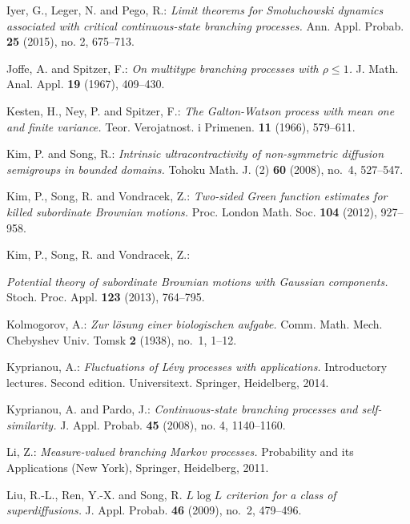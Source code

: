 \documentclass[12pt,a4paper]{amsart}
\theoremstyle{definition}
\numberwithin{equation}{section}
\begin{document}
\begin{thebibliography}{10}
	
	Iyer, G., Leger, N. and Pego, R.:
	\emph{Limit theorems for Smoluchowski dynamics associated with critical continuous-state branching processes.}
	Ann. Appl. Probab. \textbf{25} (2015), no. 2, 675–713.

	
	Joffe, A. and Spitzer, F.:
	\emph{On multitype branching processes with {$\rho \leq 1$}.}
	J. Math. Anal. Appl. \textbf{19} (1967), 409--430.
	
	
	Kesten, H., Ney, P. and Spitzer, F.:
	\emph{The {G}alton-{W}atson process with mean one and finite variance.}
	Teor. Verojatnost. i Primenen. \textbf{11} (1966), 579--611.
	
	
	Kim, P. and Song, R.:
	\emph{Intrinsic ultracontractivity of non-symmetric diffusion semigroups in bounded domains.}
	Tohoku Math. J. (2) \textbf{60} (2008), no.~4, 527--547.

  Kim, P., Song, R. and Vondracek, Z.:
  \emph{Two-sided Green function estimates for killed subordinate Brownian motions.}
  Proc. London Math. Soc. \textbf{104} (2012), 927--958.

  Kim, P., Song, R. and Vondracek, Z.:

  \emph{Potential theory of subordinate Brownian motions with Gaussian components.}
  Stoch. Proc. Appl. \textbf{123} (2013), 764--795.
	
	Kolmogorov, A.:
	\emph{Zur l{\"o}sung einer biologischen aufgabe.}
	Comm. Math. Mech. Chebyshev Univ. Tomsk \textbf{2} (1938), no.~1, 1--12.
	
	Kyprianou, A.:
	\emph{Fluctuations of Lévy processes with applications.}
	Introductory lectures. Second edition. Universitext. Springer, Heidelberg, 2014.
	
	
	Kyprianou, A. and Pardo, J.:
	\emph{Continuous-state branching processes and self-similarity.}
	J. Appl. Probab. \textbf{45} (2008), no. 4, 1140–1160.

	Li, Z.:
	\emph{Measure-valued branching {M}arkov processes.}
	Probability and its Applications (New York), Springer, Heidelberg, 2011.

	
  Liu, R.-L., Ren, Y.-X. and Song, R.
	\emph{{$L\log L$} criterion for a class of superdiffusions.}
	J. Appl. Probab. \textbf{46} (2009), no.~2, 479--496.


\end{thebibliography}
\end{document}
